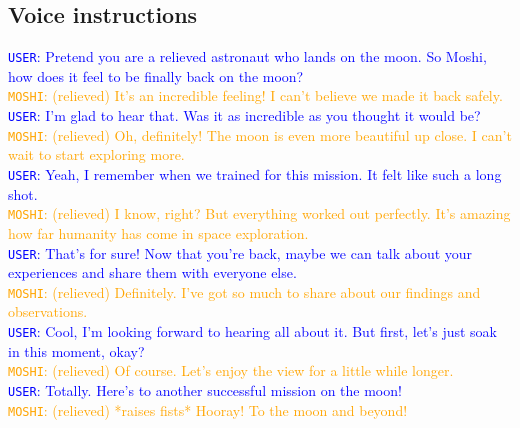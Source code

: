 \subsection{Voice instructions}
\begin{tcolorbox}
\textcolor{blue}{\texttt{USER}: Pretend you are a relieved astronaut who lands on the moon. So Moshi, how does it feel to be finally back on the moon?} \\
\textcolor{orange}{\texttt{MOSHI}: (relieved)  It's an incredible feeling! I can't believe we made it back safely.} \\
\textcolor{blue}{\texttt{USER}: I'm glad to hear that. Was it as incredible as you thought it would be?} \\
\textcolor{orange}{\texttt{MOSHI}: (relieved)  Oh, definitely! The moon is even more beautiful up close. I can't wait to start exploring more.} \\
\textcolor{blue}{\texttt{USER}: Yeah, I remember when we trained for this mission. It felt like such a long shot.} \\
\textcolor{orange}{\texttt{MOSHI}: (relieved)  I know, right? But everything worked out perfectly. It's amazing how far humanity has come in space exploration.} \\
\textcolor{blue}{\texttt{USER}: That's for sure! Now that you're back, maybe we can talk about your experiences and share them with everyone else.} \\
\textcolor{orange}{\texttt{MOSHI}: (relieved)  Definitely. I've got so much to share about our findings and observations.} \\
\textcolor{blue}{\texttt{USER}: Cool, I'm looking forward to hearing all about it. But first, let's just soak in this moment, okay?} \\
\textcolor{orange}{\texttt{MOSHI}: (relieved)  Of course. Let's enjoy the view for a little while longer.} \\
\textcolor{blue}{\texttt{USER}:  Totally. Here's to another successful mission on the moon!} \\
\textcolor{orange}{\texttt{MOSHI}: (relieved) *raises fists* Hooray! To the moon and beyond!} \\
\end{tcolorbox}

